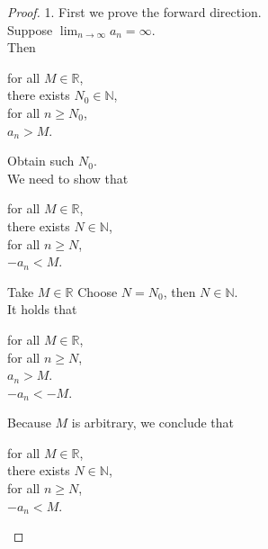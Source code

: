 \documentclass{article}
\newcommand{\N}{\mathbb{N}}
\newcommand{\R}{\mathbb{R}}
\theoremstyle{mytheoremstyle}
\theoremstyle{mytheoremstyle}
\theoremstyle{myproblemstyle}
\begin{document}
\begin{proof}
        1. First we prove the forward direction. \\
        Suppose $\lim_{n\to\infty}a_n = \infty$. \\
        Then
        \begin{center}
            \parbox{\linewidth}{
                \linewidth
                for all $M \in \R$, \\
                \hspace*{1em} there exists $N_0 \in \N$, \\
                \hspace*{2em} for all $n \geq N_0$, \\
                \hspace*{3em} $a_n > M$.
            }
        \end{center}
        Obtain such $N_0$. \\
        We need to show that
        \begin{center}
            \parbox{\linewidth}{
                \linewidth
                for all $M \in \R$, \\
                \hspace*{1em} there exists $N \in \N$, \\
                \hspace*{2em} for all $n \geq N$, \\
                \hspace*{3em} $-a_n < M$.
            }
        \end{center}
        Take $M \in \R$
        Choose $N = N_0$, then $N \in \N$. \\
        It holds that
        \begin{center}
            \parbox{\linewidth}{
                \linewidth
                for all $M \in \R$, \\
                \hspace*{1em} for all $n \geq N$, \\
                \hspace*{2em} $a_n > M$. \\
                \hspace*{3em} $-a_n < -M$.
            }
        \end{center}
        Because $M$ is arbitrary, we conclude that
        \begin{center}
            \parbox{\linewidth}{
                \linewidth
                for all $M \in \R$, \\
                \hspace*{1em} there exists $N \in \N$, \\
                \hspace*{2em} for all $n \geq N$, \\
                \hspace*{3em} $-a_n < M$.
            }
        \end{center}
    \end{proof}
\end{document}
